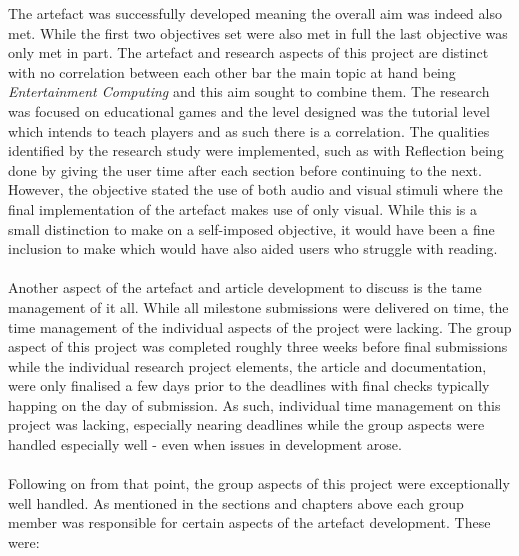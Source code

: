 \noindent The artefact was successfully developed meaning the overall aim was indeed also met. While the first two objectives set were also met in full the last objective was only met in part. The artefact and research aspects of this project are distinct with no correlation between each other bar the main topic at hand being \textit{Entertainment Computing} and this aim sought to combine them. The research was focused on educational games and the level designed was the tutorial level which intends to teach players and as such there is a correlation. The qualities identified by the research study were implemented, such as with Reflection being done by giving the user time after each section before continuing to the next. However, the objective stated the use of both audio and visual stimuli where the final implementation of the artefact makes use of only visual. While this is a small distinction to make on a self-imposed objective, it would have been a fine inclusion to make which would have also aided users who struggle with reading.
\\\\
Another aspect of the artefact and article development to discuss is the tame management of it all. While all milestone submissions were delivered on time, the time management of the individual aspects of the project were lacking. The group aspect of this project was completed roughly three weeks before final submissions while the individual research project elements, the article and documentation, were only finalised a few days prior to the deadlines with final checks typically happing on the day of submission. As such, individual time management on this project was lacking, especially nearing deadlines while the group aspects were handled especially well - even when issues in development arose.
\\\\
Following on from that point, the group aspects of this project were exceptionally well handled. As mentioned in the sections and chapters above each group member was responsible for certain aspects of the artefact development. These were: %
